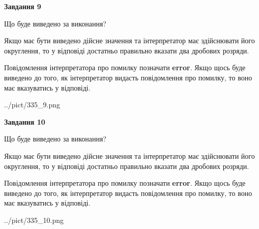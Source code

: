 \documentclass[12pt, ukrainian]{article}
\begin{document}
{\begin {Large}
{\begin {center}\textbf{Завдання 9}\end {center}}\par
Що буде виведено за виконання? \par

Якщо має бути виведено дійсне значення та інтерпретатор має здійснювати його округлення, 
то у відповіді достатньо правильно вказати два дробових розряди.

Повідомлення інтерпретатора про помилку позначати \textbf{error}.
Якщо щось буде виведено до того, як інтерпретатор видасть повідомлення про помилку, 
то воно має вказуватись у відповіді. \par

\begin{center}
	{../pict/335_9.png}
\end{center}
\newpage

{\begin {center}\textbf{Завдання 10}\end {center}}\par
Що буде виведено за виконання? \par

Якщо має бути виведено дійсне значення та інтерпретатор має здійснювати його округлення, 
то у відповіді достатньо правильно вказати два дробових розряди.

Повідомлення інтерпретатора про помилку позначати \textbf{error}.
Якщо щось буде виведено до того, як інтерпретатор видасть повідомлення про помилку, 
то воно має вказуватись у відповіді. \par

\begin{center}
	{../pict/335_10.png}
\end{center}
\newpage

\end {Large}}
\end{document}
